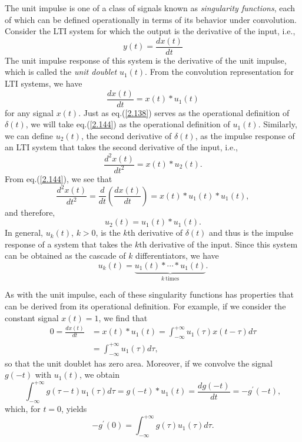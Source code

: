 \documentclass[a4paper,10pt,twoside]{book}
\begin{document}
The unit impulse is one of a class of signals known as \textit{singularity functions}, each of which can be defined operationally in terms of its behavior under convolution. Consider the LTI system for which the output is the derivative of the input, i.e.,
\begin{equation}
    y(t)=\dfrac{dx(t)}{dt}
    \label{2.143}
\end{equation}
The unit impulse response of this system is the derivative of the unit impulse, which is called the \textit{unit doublet} $u_1(t)$. From the convolution representation for LTI systems, we have
\begin{equation}
    \frac{dx(t)}{dt}=x(t)*u_1(t)
    \label{2.144}
\end{equation}
for any signal $x(t)$. Just as eq.\;(\ref{2.138}) serves as the operational definition of $\delta(t)$, we will take eq.\;(\ref{2.144}) as the operational definition of $u_1(t)$. Similarly, we can define $u_2(t)$, the second derivative of $\delta(t)$, as the impulse response of an LTI system that takes the second derivative of the input, i.e.,
\begin{equation}
    \frac{d^2x(t)}{dt^2}=x(t)*u_2(t).
    \label{2.145}
\end{equation}
From eq.\;(\ref{2.144}), we see that
\begin{equation}
    \frac{d^2x(t)}{dt^2}=\frac d{dt}\left(\frac{dx(t)}{dt}\right)=x(t)*u_1(t)*u_1(t),
    \label{2.146}
\end{equation}
and therefore,
\begin{equation}
    u_2(t)=u_1(t)*u_1(t).
    \label{2.147}
\end{equation}
In general, $u_k(t)$, $k>0$, is the $k$th derivative of $\delta(t)$ and thus is the impulse response of a system that takes the $k$th derivative of the input. Since this system can be obtained as the cascade of $k$ differentiators, we have
\begin{equation}
    u_k(t)=\underbrace{u_1(t)*\cdots*u_1(t)}_{k\mathrm{~times}}.
    \label{2.148}
\end{equation}

As with the unit impulse, each of these singularity functions has properties that can be derived from its operational definition. For example, if we consider the constant signal $x(t)=1$, we find that $$\begin{aligned}0=\frac{dx(t)}{dt}&= x(t)*u_{1}(t)=\int_{-\infty}^{+\infty}u_{1}(\tau)x(t-\tau) d\tau\\&=\int_{-\infty}^{+\infty}u_{1}(\tau) d\tau,\end{aligned}$$ so that the unit doublet has zero area. Moreover, if we convolve the signal $g(-t)$ with $u_1(t)$, we obtain $$\int_{-\infty}^{+\infty}g(\tau-t)u_1(\tau) d\tau= g(-t)*u_1(t) = \frac{dg(-t)}{dt} = -g^{\prime}(-t),$$ which, for $t=0$, yields
\begin{equation}
    -g^{\prime}(0) = \int_{-\infty}^{+\infty}g(\tau)u_1(\tau) d\tau.
    \label{2.149}
\end{equation}
\end{document}
